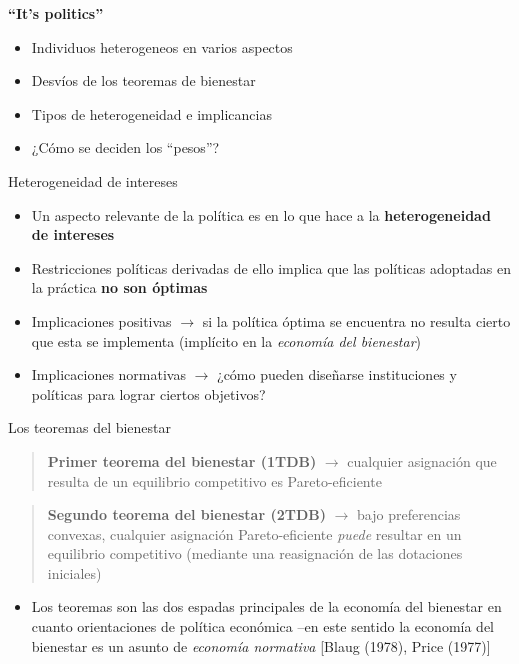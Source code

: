 \documentclass[
  ignorenonframetext,
]{beamer}
\providecommand{\tightlist}{%
  \setlength{\itemsep}{0pt}\setlength{\parskip}{0pt}}\usepackage{longtable,booktabs,array}
\begin{document}
\begin{frame}{\textbf{``It's politics''}}
\protect\hypertarget{its-politics}{}
\begin{itemize}
\tightlist
\item
  Individuos heterogeneos en varios aspectos
\item
  Desvíos de los teoremas de bienestar
\item
  Tipos de heterogeneidad e implicancias
\item
  ¿Cómo se deciden los ``pesos''?
\end{itemize}

\begin{block}{Heterogeneidad de intereses}
\protect\hypertarget{heterogeneidad-de-intereses}{}
\begin{itemize}
\tightlist
\item
  Un aspecto relevante de la política es en lo que hace a la
  \textbf{heterogeneidad de intereses}
\item
  Restricciones políticas derivadas de ello implica que las políticas
  adoptadas en la práctica \textbf{no son óptimas}
\item
  Implicaciones positivas \(\longrightarrow\) si la política óptima se
  encuentra no resulta cierto que esta se implementa (implícito en la
  \emph{economía del bienestar})
\item
  Implicaciones normativas \(\longrightarrow\) ¿cómo pueden diseñarse
  instituciones y políticas para lograr ciertos objetivos?
\end{itemize}
\end{block}

\begin{block}{Los teoremas del bienestar}
\protect\hypertarget{los-teoremas-del-bienestar}{}
\begin{quote}
\textbf{Primer teorema del bienestar (1TDB)} \(\longrightarrow\)
cualquier asignación que resulta de un equilibrio competitivo es
Pareto-eficiente
\end{quote}

\begin{quote}
\textbf{Segundo teorema del bienestar (2TDB)} \(\longrightarrow\) bajo
preferencias convexas, cualquier asignación Pareto-eficiente
\emph{puede} resultar en un equilibrio competitivo (mediante una
reasignación de las dotaciones iniciales)
\end{quote}

\begin{itemize}
\tightlist
\item
  Los teoremas son las dos espadas principales de la economía del
  bienestar en cuanto orientaciones de política económica --en este
  sentido la economía del bienestar es un asunto de \emph{economía
  normativa} {[}Blaug (1978), Price (1977){]}
\end{itemize}
\end{block}


\end{frame}
\end{document}
